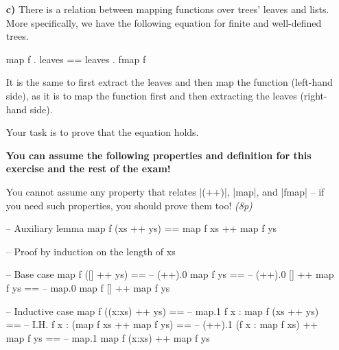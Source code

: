 \documentclass[a4,11pt]{article}
\newif\ifsol
\newcommand{\points}[1]{\hfill \textsl{({#1}p)}}
\begin{document}
\begin{enumerate}
\item [\textbf{c)}] There is a relation between mapping functions over trees'
  leaves and lists. More specifically, we have the following equation for finite
  and well-defined trees.

  \begin{code}
  map f . leaves == leaves . fmap f
  \end{code}

  It is the same to first extract the leaves and then map the function
  (left-hand side), as it is to map the function first and then extracting the
  leaves (right-hand side).

  Your task is to prove that the equation holds.

  \textbf{You can assume the following
  properties and definition for this exercise and the rest of the exam!}


  You cannot assume any property that relates |(++)|, |map|, and |fmap| -- if
  you need such properties, you should prove them too!  \points{8}

  \ifsol
  \begin{code}
  -- Auxiliary lemma
  map f (xs ++ ys) == map f xs ++ map f ys

  -- Proof by induction on the length of xs

  -- Base case
     map f ([] ++ ys)  ==
  -- (++).0
     map f ys          ==
  -- (++).0
     [] ++ map f ys    ==
  -- map.0
     map f [] ++ map f ys

  -- Inductive case
     map f ((x:xs) ++ ys)          ==
  -- map.1
     f x : map f (xs ++ ys)        ==
  -- I.H.
     f x : (map f xs ++ map f ys)  ==
  -- (++).1
     (f x : map f xs) ++ map f ys  ==
  -- map.1
     map f (x:xs) ++ map f ys
  \end{code}


\end{enumerate}
\end{document}
